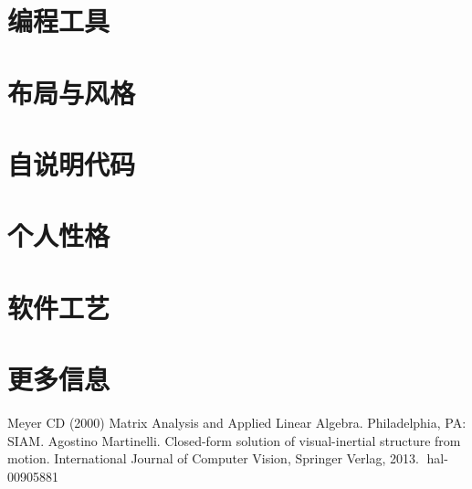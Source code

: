 \documentclass{article}
\begin{document}
\section{编程工具}

\section{布局与风格}

\section{自说明代码}

\section{个人性格}

\section{软件工艺}

\section{更多信息}


\begin{thebibliography}{99}  
    Meyer CD (2000) Matrix Analysis and Applied Linear Algebra. Philadelphia, PA: SIAM.
     Agostino Martinelli. Closed-form solution of visual-inertial structure from motion. International
    Journal of Computer Vision, Springer Verlag, 2013. ￿hal-00905881
\end{thebibliography}
\end{document}
